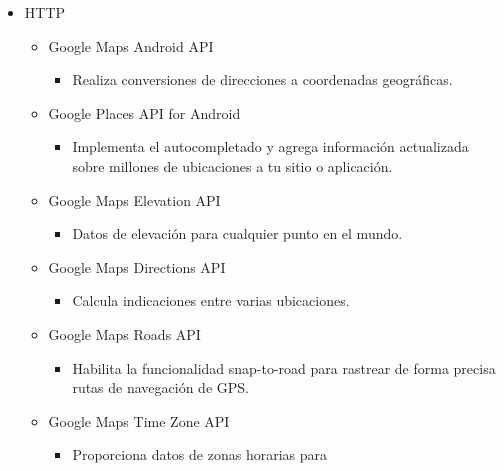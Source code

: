 \documentclass[a4paper, 11pt]{article}
\begin{document}
\begin{itemize}
\begin{itemize}
\begin{itemize}
                \end{itemize}
              \item{HTTP}
                \begin{itemize}
                    \item{Google Maps Android API}
                      \begin{itemize}
                          \item{Realiza conversiones de direcciones a
                                coordenadas geográficas.}
                      \end{itemize}
                    \item{Google Places API for Android}
                      \begin{itemize}
                          \item{Implementa el autocompletado y agrega
                                información actualizada sobre millones de
                                ubicaciones a tu sitio o aplicación.}
                      \end{itemize}
                    \item{Google Maps Elevation API}
                      \begin{itemize}
                          \item{Datos de elevación para cualquier punto en el
                                mundo.}
                      \end{itemize}
                    \item{Google Maps Directions API}
                      \begin{itemize}
                          \item{Calcula indicaciones entre varias ubicaciones.}
                      \end{itemize}
                    \item{Google Maps Roads API}
                      \begin{itemize}
                          \item{Habilita la funcionalidad snap-to-road para
                                rastrear de forma precisa rutas de navegación de
                                GPS.}
                      \end{itemize}
                    \item{Google Maps Time Zone API}
                      \begin{itemize}
                          \item{Proporciona datos de zonas horarias para
}
\end{itemize}
\end{itemize}
\end{itemize}
\end{itemize}
\end{document}
